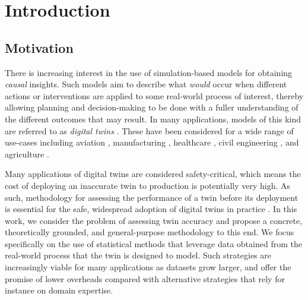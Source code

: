 \section{Introduction}

\subsection{Motivation}

There is increasing interest in the use of simulation-based models for obtaining \emph{causal} insights.
Such models aim to describe what \emph{would} occur when different actions or interventions are applied to some real-world process of interest, thereby allowing planning and decision-making to be done with a fuller understanding of the different outcomes that may result.
In many applications, models of this kind are referred to as \emph{digital twins} \citep{barricelli2019survey,jones2020characterising,niederer2021scaling}.
These have been considered for a wide range of use-cases including aviation \citep{tuegel2011reengineering}, manufacturing \citep{lu2020digital}, healthcare \citep{corral2020digital,coorey2022health}, civil engineering \citep{sacks2020construction}, and agriculture \citep{jans2020digital}.

Many applications of digital twins are considered safety-critical, which means the cost of deploying an inaccurate twin to production is potentially very high.
As such, methodology for assessing the performance of a twin before its deployment is essential for the safe, widespread adoption of digital twins in practice \citep{niederer2021scaling}.
In this work, we consider the problem of assessing twin accuracy and propose a concrete, theoretically grounded, and general-purpose methodology to this end.
We focus specifically on the use of statistical methods that leverage data obtained from the real-world process that the twin is designed to model.
Such strategies are increasingly viable for many applications as datasets grow larger, and offer the promise of lower overheads compared with alternative strategies that rely for instance on domain expertise.

